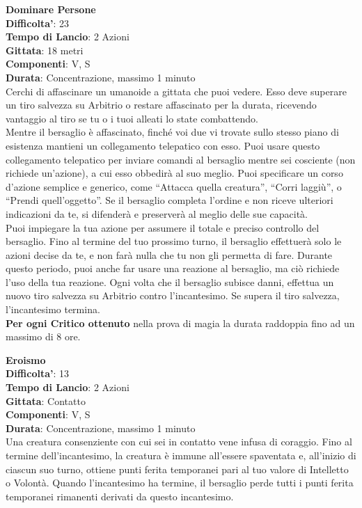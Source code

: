 \begin{multicols}{2}
\medskip\textbf{Dominare Persone}\\
\textbf{Difficolta'}: 23\\
\textbf{Tempo di Lancio}: 2 Azioni\\
\textbf{Gittata}: 18 metri\\
\textbf{Componenti}: V, S\\
\textbf{Durata}: Concentrazione, massimo 1 minuto\\
Cerchi di affascinare un umanoide a gittata che puoi vedere. Esso deve superare un tiro salvezza su Arbitrio o restare affascinato per la durata, ricevendo vantaggio al tiro se tu o i tuoi alleati lo state combattendo.\\
Mentre il bersaglio è affascinato, finché voi due vi trovate sullo stesso piano di esistenza mantieni un collegamento telepatico con esso. Puoi usare questo collegamento telepatico per inviare comandi al bersaglio mentre sei cosciente (non richiede un’azione), a cui esso obbedirà al suo meglio. Puoi specificare un corso d’azione semplice e generico, come “Attacca quella creatura”, “Corri laggiù”, o “Prendi quell’oggetto”. Se il bersaglio completa l’ordine e non riceve ulteriori indicazioni da te, si difenderà e preserverà al meglio delle sue capacità.\\
Puoi impiegare la tua azione per assumere il totale e preciso controllo del bersaglio. Fino al termine del tuo prossimo turno, il bersaglio effettuerà solo le azioni decise da te, e non farà nulla che tu non gli permetta di fare. Durante questo periodo, puoi anche far usare una reazione al bersaglio, ma ciò richiede l’uso della tua reazione. Ogni volta che il bersaglio subisce danni, effettua un nuovo tiro salvezza su Arbitrio contro l’incantesimo. Se supera il tiro salvezza, l’incantesimo termina.\\
\textbf{Per ogni Critico ottenuto} nella prova di magia la durata raddoppia fino ad un massimo di 8 ore.

\medskip\textbf{Eroismo}\\
\textbf{Difficolta'}: 13\\
\textbf{Tempo di Lancio}: 2 Azioni\\
\textbf{Gittata}: Contatto\\
\textbf{Componenti}: V, S\\
\textbf{Durata}: Concentrazione, massimo 1 minuto\\
Una creatura consenziente con cui sei in contatto vene infusa di coraggio. Fino al termine dell’incantesimo, la creatura è immune all’essere spaventata e, all’inizio di ciascun suo turno, ottiene punti ferita temporanei pari al tuo valore di Intelletto o Volontà. Quando l’incantesimo ha termine, il bersaglio perde tutti  i punti ferita temporanei rimanenti derivati da questo
incantesimo.


\end{multicols}
